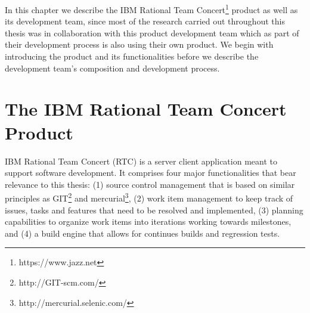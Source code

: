 \label{chap:rtc}
In this chapter we describe the IBM Rational Team Concert\footnote{https://www.jazz.net} product as well as its development team,
since most of the research carried out throughout this thesis was in collaboration with this product development team which as part of their development process is also using their own product.
We begin with introducing the product and its functionalities before we describe the development team's composition and development process.

\section{The IBM Rational Team Concert Product}
IBM Rational Team Concert (RTC) is a server client application meant to support software development.
It comprises four major functionalities that bear relevance to this thesis:
(1) source control management that is based on similar principles as GIT\footnote{http://GIT-scm.com/} and mercurial\footnote{http://mercurial.selenic.com/}, (2) work item management to keep track of issues, tasks and features that need to be resolved and implemented, (3) planning capabilities to organize work items into iterations working towards milestones, and (4) a build engine that allows for continues builds and regression tests.

